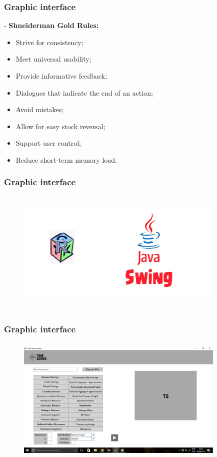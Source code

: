 \documentclass[10pt, compress]{beamer}
\begin{document}
\begin{frame}[fragile]
\frametitle{Graphic interface}

-\textbf{ \Large Shneiderman Gold Rules:}

\begin{itemize}
\item Strive for consistency;
\item Meet universal usability;
\item Provide informative feedback;
\item Dialogues that indicate the end of an action;
\item Avoid mistakes;
\item Allow for easy stock reversal;
\item Support user control;
\item Reduce short-term memory load.
\end{itemize}
\end{frame}

\begin{frame}[fragile]
\frametitle{Graphic interface}
\begin{figure}
  \centering
   \includegraphics[width=10cm,height=6cm]{FInterface.png}
\end{figure}
\end{frame}

\begin{frame}[fragile]
\frametitle{Graphic interface}
\begin{figure}
  \centering
   \includegraphics[width=10cm,height=6cm]{tela4.png}
\end{figure}
\end{frame}
\end{document}
